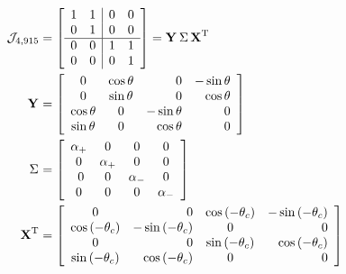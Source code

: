 \begin{equation}
  \begin{split}
    \mathcal{J}_{4,915} &= 
\mat{cc|cc}
{
                1 & 1 & 0 & 0 \\
                0 & 1 & 0 & 0 \\\hline
                0 & 0 & 1 & 1 \\
                0 & 0 & 0 & 1
}   = \svd{T}\\
   \Y{} &=
\mat{ccrr}
{
                 0 & \cos\theta & 0 & -\sin\theta \\
                 0 & \sin\theta & 0 & \cos\theta \\
                \cos\theta & 0 & -\sin\theta & 0 \\
                \sin\theta & 0 &  \cos\theta & 0
}\\
\sig{} &=
\mat{cccc}
{                
            \alpha_{+} & 0 & 0 & 0 \\
            0 & \alpha_{+} & 0 & 0 \\\
            0 & 0 & \alpha_{-} & 0\\
            0 & 0 & 0 & \alpha_{-}
}\\
\X{T} &=
\mat{crcr}
{                
                0 & 0 & \cos\paren{-\theta_{c}} & -\sin\paren{-\theta_{c}} \\
                \cos\paren{-\theta_{c}} & -\sin\paren{-\theta_{c}} & 0 & 0 \\
                0 & 0 & \sin\paren{-\theta_{c}} &  \cos\paren{-\theta_{c}} \\
                \sin\paren{-\theta_{c}} &  \cos\paren{-\theta_{c}} & 0 & 0
}
  \end{split}
\end{equation}


\endinput